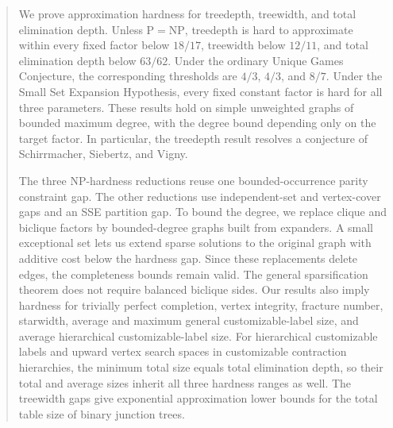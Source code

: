 \begin{abstract}
We prove approximation hardness for treedepth, treewidth, and total
elimination depth. Unless $\mathrm{P}=\mathrm{NP}$, treedepth is hard
to approximate within every fixed factor below $18/17$, treewidth below
$12/11$, and total elimination depth below $63/62$.
Under the ordinary Unique Games Conjecture, the corresponding
thresholds are $4/3$, $4/3$, and $8/7$. Under the Small Set Expansion
Hypothesis, every fixed constant factor is hard for all three parameters.
These results hold on simple unweighted graphs of bounded maximum degree,
with the degree bound depending only on the target factor. In particular,
the treedepth result resolves a conjecture of Schirrmacher, Siebertz, and
Vigny.

The three NP-hardness reductions reuse one bounded-occurrence parity
constraint gap. The other reductions use independent-set and vertex-cover
gaps and an SSE partition gap. To bound the degree, we replace clique
and biclique factors by bounded-degree graphs built from expanders. A small
exceptional set lets us extend sparse solutions to the original graph
with additive cost below the hardness gap. Since these replacements delete
edges, the completeness bounds remain
valid. The general sparsification theorem does not require balanced
biclique sides.
Our results also imply hardness for trivially perfect completion, vertex
integrity, fracture number, starwidth, average and maximum general
customizable-label size, and average hierarchical customizable-label size.
For hierarchical customizable labels and upward vertex search spaces
in customizable contraction hierarchies,
the minimum total size equals total elimination depth, so their total and
average sizes inherit all three hardness ranges as well.
The treewidth gaps give exponential approximation lower bounds for the
total table size of binary junction trees.
\end{abstract}

